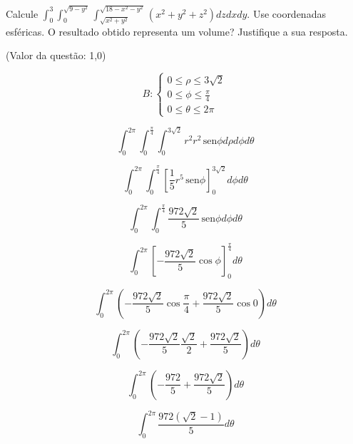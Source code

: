 \documentclass[10pt,a4paper]{article}
\newcommand{\sen}{\hspace{2pt}\textrm{sen}}
\begin{document}
	Calcule $ \int_{0}^3 \int_{0}^{\sqrt{9-y^2}} \int_{\sqrt{x^2+y^2}}^{\sqrt{18-x^2-y^2}} (x^2 + y^2 + z^2) dz dx dy $. Use coordenadas esféricas. O resultado obtido representa um volume? Justifique a sua resposta.
	
	(Valor da questão: 1,0)
	
	\begin{equation}
		B:
		\begin{cases}
		0 \le \rho \le 3\sqrt{2}\\
		0 \le \phi \le \frac{\pi}{4}\\
		0 \le \theta \le 2\pi
		\end{cases}
	\end{equation}
	
	\begin{equation}
		\int_{0}^{2\pi} \int_{0}^{\frac{\pi}{4}} \int_{0}^{3\sqrt{2}} r^2 r^2 \sen \phi d\rho d\phi d\theta
	\end{equation}
	
	\begin{equation}
		\int_{0}^{2\pi} \int_{0}^{\frac{\pi}{4}} \left[ \frac{1}{5}r^5 \sen \phi \right]_{0}^{3\sqrt{2}} d\phi d\theta
	\end{equation}
	
	\begin{equation}
		\int_{0}^{2\pi} \int_{0}^{\frac{\pi}{4}} \frac{972\sqrt{2}}{5} \sen \phi d\phi d\theta
	\end{equation}
	
	\begin{equation}
		\int_{0}^{2\pi} \left[-\frac{972\sqrt{2}}{5} \cos \phi \right]_{0}^{\frac{\pi}{4}} d\theta
	\end{equation}
	
	\begin{equation}
		\int_{0}^{2\pi} \left(-\frac{972\sqrt{2}}{5} \cos \frac{\pi}{4} + \frac{972\sqrt{2}}{5} \cos 0 \right) d\theta
	\end{equation}
	
	\begin{equation}
		\int_{0}^{2\pi} \left(-\frac{972\sqrt{2}}{5} \frac{\sqrt{2}}{2} + \frac{972\sqrt{2}}{5} \right) d\theta
	\end{equation}
	
	\begin{equation}
		\int_{0}^{2\pi} \left(-\frac{972}{5} + \frac{972\sqrt{2}}{5} \right) d\theta
	\end{equation}
	
	\begin{equation*}
		\int_{0}^{2\pi} \frac{972(\sqrt{2} - 1)}{5} d\theta
	\end{equation*}
	
\end{document}
